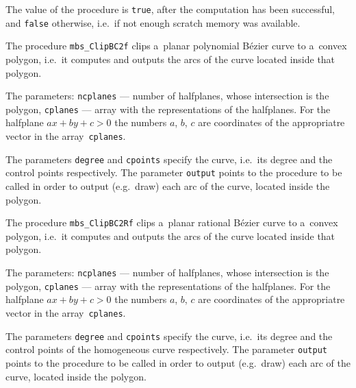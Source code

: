 The value of the procedure is \texttt{true}, after the computation has been
successful, and \texttt{false} otherwise, i.e.\ if not enough scratch memory
was available.

\vspace{\bigskipamount}
The procedure \texttt{mbs\_ClipBC2f} clips a~planar polynomial B\'{e}zier
curve to a~convex polygon, i.e.\ it computes and outputs the arcs of the
curve located inside that polygon.

The parameters: \texttt{ncplanes} --- number of halfplanes, whose intersection
is the polygon, \texttt{cplanes} --- array with the representations
of the halfplanes. For the halfplane $ax+by+c>0$ the numbers
$a$, $b$, $c$ are coordinates of the appropriatre vector in the
array~\texttt{cplanes}.

The parameters \texttt{degree} and \texttt{cpoints} specify the curve,
i.e.\ its degree and the control points respectively.
The parameter \texttt{output} points to the procedure to be called in order
to output (e.g.\ draw) each arc of the curve, located inside the polygon.

\vspace{\bigskipamount}
The procedure \texttt{mbs\_ClipBC2Rf} clips a~planar rational B\'{e}zier
curve to a~convex polygon, i.e.\ it computes and outputs the arcs of the
curve located inside that polygon.

The parameters: \texttt{ncplanes} --- number of halfplanes, whose intersection
is the polygon, \texttt{cplanes} --- array with the representations
of the halfplanes. For the halfplane $ax+by+c>0$ the numbers
$a$, $b$, $c$ are coordinates of the appropriatre vector in the
array~\texttt{cplanes}.

The parameters \texttt{degree} and \texttt{cpoints} specify the curve,
i.e.\ its degree and the control points of the homogeneous curve respectively.
The parameter \texttt{output} points to the procedure to be called in order
to output (e.g.\ draw) each arc of the curve, located inside the polygon.

